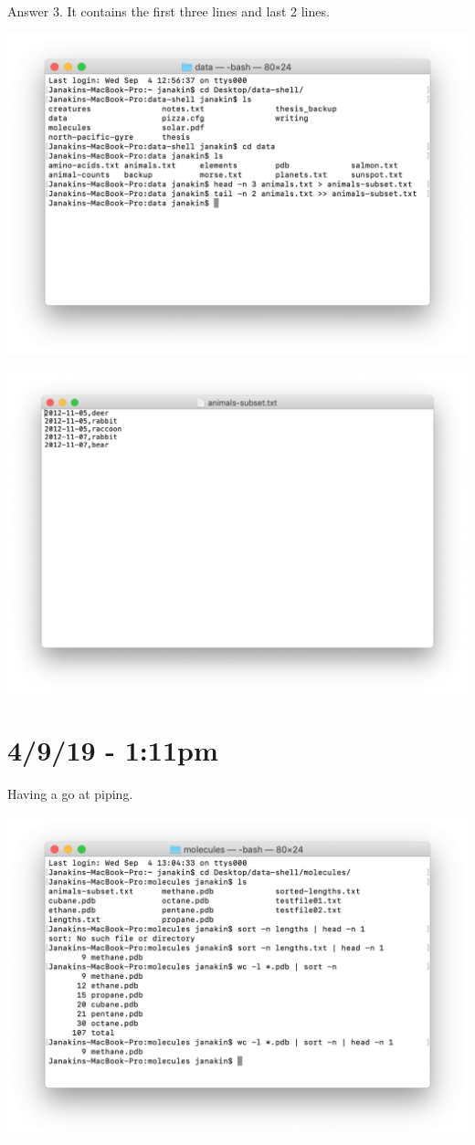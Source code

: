 \documentclass{article}
\begin{document}
Answer 3. It contains the first three lines and last 2 lines.

\includegraphics[width=\textwidth]{figi.png}

\includegraphics[width=\textwidth]{figj.png}

\section*{4/9/19 - 1:11pm}

Having a go at piping.

\includegraphics[width=\textwidth]{figk.png}
\end{document}
